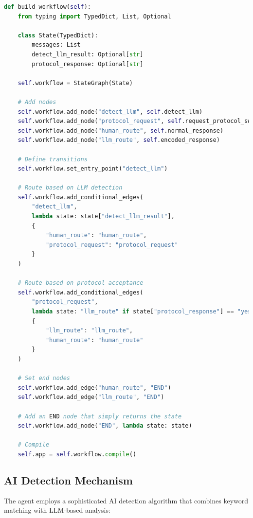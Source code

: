 \documentclass[12pt,openany]{article}
\theoremstyle{definition}
\theoremstyle{definition}
\theoremstyle{definition}
\begin{document}
\begin{lstlisting}[language=Python, caption=LangGraph Workflow Definition]
def build_workflow(self):
    from typing import TypedDict, List, Optional
    
    class State(TypedDict):
        messages: List
        detect_llm_result: Optional[str]
        protocol_response: Optional[str]
        
    self.workflow = StateGraph(State)
    
    # Add nodes
    self.workflow.add_node("detect_llm", self.detect_llm)
    self.workflow.add_node("protocol_request", self.request_protocol_switch)
    self.workflow.add_node("human_route", self.normal_response)
    self.workflow.add_node("llm_route", self.encoded_response)
    
    # Define transitions
    self.workflow.set_entry_point("detect_llm")
    
    # Route based on LLM detection
    self.workflow.add_conditional_edges(
        "detect_llm",
        lambda state: state["detect_llm_result"],
        {
            "human_route": "human_route",
            "protocol_request": "protocol_request" 
        }
    )
    
    # Route based on protocol acceptance
    self.workflow.add_conditional_edges(
        "protocol_request",
        lambda state: "llm_route" if state["protocol_response"] == "yes" else "human_route",
        {
            "llm_route": "llm_route",
            "human_route": "human_route"
        }
    )
    
    # Set end nodes
    self.workflow.add_edge("human_route", "END")
    self.workflow.add_edge("llm_route", "END")
    
    # Add an END node that simply returns the state
    self.workflow.add_node("END", lambda state: state)
    
    # Compile
    self.app = self.workflow.compile()
\end{lstlisting}

\subsection*{AI Detection Mechanism}
The agent employs a sophisticated AI detection algorithm that combines keyword matching with LLM-based analysis:
\end{document}
